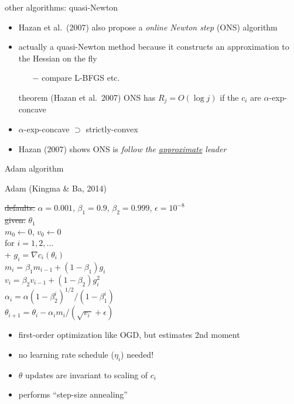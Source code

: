 \documentclass[xcolor={svgnames},
               hyperref={colorlinks,citecolor=DeepPink4,linkcolor=FireBrick,urlcolor=Maroon},
               usepdftitle=false]  %
               {beamer}
\newcommand{\grad}{\nabla}
\newcommand{\eps}{\epsilon}
\begin{document}
\begin{frame}{other algorithms: quasi-Newton}

\begin{itemize}
\item Hazan et al.~(2007) also propose a \emph{online Newton step} (ONS) algorithm
\item actually a quasi-Newton method because it constructs an approximation to the Hessian on the fly
    \begin{itemize}
    \item[$-$] compare L-BFGS etc.
    \end{itemize}

\begin{block}{theorem (Hazan et al.~2007)}
ONS has $R_j = O(\log j)$ if the $c_i$ are $\alpha$-exp-concave
\end{block}

\item $\alpha$-exp-concave $\supset$ strictly-convex
\item Hazan (2007) shows ONS is \emph{follow the \underline{approximate} leader}
\end{itemize}
\end{frame}


\begin{frame}{Adam algorithm}

\begin{block}{Adam (Kingma \& Ba, 2014)}

\begin{pseudo*}
\st{defaults:} $\alpha=0.001$, $\beta_1=0.9$, $\beta_2=0.999$, $\eps=10^{-8}$ \\
\st{given:} $\theta_1$ \\
$m_0 \gets 0$, $v_0 \gets 0$ \\
for $i=1,2,\dots$ \\+
    $g_i = \grad c_i(\theta_i)$ \\
    $m_i = \beta_1 m_{i-1} + (1-\beta_1) g_i$  \hspace{15mm}  \\
    $v_i = \beta_2 v_{i-1} + (1-\beta_2) g_i^2$  \hspace{17mm}  \\
    $\alpha_i = \alpha (1-\beta_2^i)^{1/2} / (1-\beta_1^i)$  \hspace{13mm}  \\
    $\theta_{i+1} = \theta_i - \alpha_i m_i / (\sqrt{v_i\,} + \eps)$
\end{pseudo*}
\end{block}

\begin{itemize}
\item first-order optimization like OGD, but estimates 2nd moment
\item no learning rate schedule ($\eta_i$) needed!
\item $\theta$ updates are invariant to scaling of $c_i$
\item performs ``step-size annealing''
\end{itemize}
\end{frame}
\end{document}
